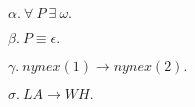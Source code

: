 

$ \alpha.\  \forall \ P \ \exists \ \omega. $

$ \beta.\  P \equiv \epsilon. $

$ \gamma.\  nynex(1) \rightarrow nynex(2). $

$ \sigma.\  LA \rightarrow WH. $




\bye
